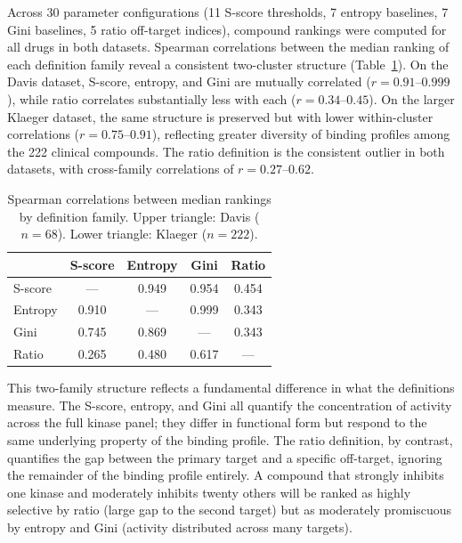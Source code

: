 \documentclass[journal=jcisd8,manuscript=article]{achemso}
\begin{document}
Across 30 parameter configurations (11 S-score thresholds, 7 entropy
baselines, 7 Gini baselines, 5 ratio off-target indices), compound rankings
were computed for all drugs in both datasets.
Spearman correlations between the median ranking of each definition family
reveal a consistent two-cluster structure (Table~\ref{tab:correlations}).
On the Davis dataset, S-score, entropy, and Gini are mutually correlated
($r = 0.91$--$0.999$), while ratio correlates substantially less with each
($r = 0.34$--$0.45$).
On the larger Klaeger dataset, the same structure is preserved but with lower
within-cluster correlations ($r = 0.75$--$0.91$), reflecting greater
diversity of binding profiles among the 222 clinical compounds.
The ratio definition is the consistent outlier in both datasets, with
cross-family correlations of $r = 0.27$--$0.62$.

\begin{table}[h]
  \centering
  \caption{Spearman correlations between median rankings by definition family.
           Upper triangle: Davis ($n=68$). Lower triangle: Klaeger ($n=222$).}
  \label{tab:correlations}
  \begin{tabular}{lcccc}
    \toprule
                & S-score & Entropy & Gini  & Ratio \\
    \midrule
    S-score     & ---     & 0.949   & 0.954 & 0.454 \\
    Entropy     & 0.910   & ---     & 0.999 & 0.343 \\
    Gini        & 0.745   & 0.869   & ---   & 0.343 \\
    Ratio       & 0.265   & 0.480   & 0.617 & ---   \\
    \bottomrule
  \end{tabular}
\end{table}

This two-family structure reflects a fundamental difference in what the
definitions measure.
The S-score, entropy, and Gini all quantify the concentration of activity
across the full kinase panel; they differ in functional form but respond to
the same underlying property of the binding profile.
The ratio definition, by contrast, quantifies the gap between the primary
target and a specific off-target, ignoring the remainder of the binding
profile entirely.
A compound that strongly inhibits one kinase and moderately inhibits twenty
others will be ranked as highly selective by ratio (large gap to the
second target) but as moderately promiscuous by entropy and Gini
(activity distributed across many targets).
\end{document}
